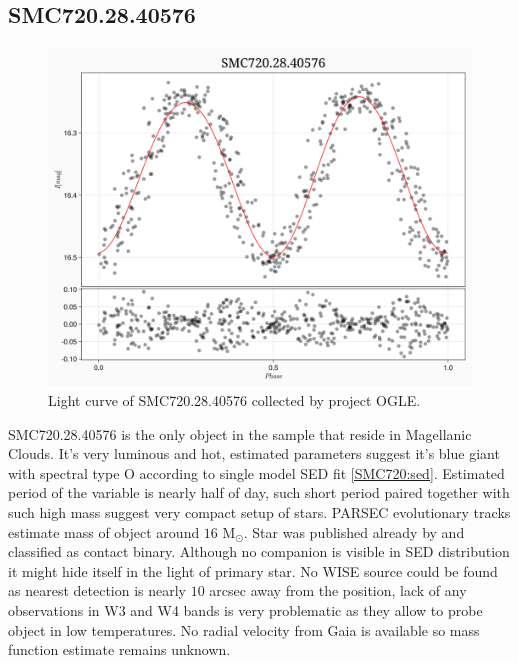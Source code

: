 \documentclass{pracalicmgr}
\begin{document}
\subsection{SMC720.28.40576}
\begin{figure}[H]
      \centering
      \includegraphics[scale=0.35]{plots/SMC720.28.40576_phase.png}
      \caption{Light curve of SMC720.28.40576 collected by project OGLE.}
      \label{SMC720:lc}
\end{figure}
SMC720.28.40576 is the only object in the sample that reside in Magellanic Clouds. It's very luminous and hot, 
estimated parameters suggest it's blue giant with spectral type O according to single model SED fit \ref{SMC720:sed}.
Estimated period of the variable is nearly half of day, such short period paired together with such high mass suggest very compact setup of stars.
PARSEC evolutionary tracks estimate mass of object around $16$  $\textrm{M}_{\odot}$. Star was published already by \citep{pawlak_ogle_2016} and classified as contact binary. Although
no companion is visible in SED distribution it might hide itself in the light of primary star.
No WISE source could be found as nearest detection is nearly $10$ arcsec away from the position, lack of any observations 
in W3 and W4 bands is very problematic as they allow to probe object in low temperatures.
No radial velocity from Gaia is available so mass function estimate remains unknown.
\end{document}
